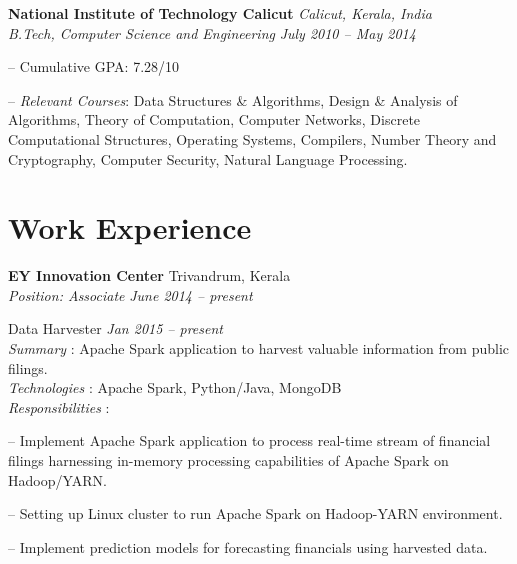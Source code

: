 \documentclass[margin,line]{resume}
\begin{document}
\begin{resume}
    \textbf{National Institute of Technology Calicut} \hfill \textit{Calicut, Kerala, India} \vspace{1mm}\\\vspace{1mm}%
    \textsl{B.Tech, Computer Science and Engineering} \hfill \textit{ July 2010 -- May 2014}\vspace{-3mm}\\\vspace{-1mm}%
    \begin{list2}
        \item[--] Cumulative GPA: 7.28/10 
        \item[--] \textit{Relevant Courses}: Data Structures \& Algorithms, Design \& Analysis of Algorithms, Theory
of Computation, Computer Networks, Discrete Computational Structures, Operating Systems, 
Compilers, Number Theory and Cryptography, Computer Security, Natural Language Processing.
    \end{list2}\vspace{-1.5mm}
    
 \vspace{3mm}


    \section{\mysidestyle Work Experience}


    \textbf{EY Innovation Center } 				\hfill  Trivandrum, Kerala \\
      \textit{Position: Associate } 			\hfill \textit{June 2014 -- present}
  

Data Harvester				 				\hfill \textit{Jan 2015 -- present} \\
\textit{Summary} : Apache Spark application to harvest valuable information from public filings. \\
      \textit{Technologies} : Apache Spark, Python/Java, MongoDB\\
\textit{Responsibilities} : 
     	 	\begin{list2}
\item[--]Implement Apache Spark application to process real-time stream of financial filings harnessing 
 in-memory processing capabilities of Apache Spark on Hadoop/YARN.
	\item[--] Setting up Linux cluster to run Apache Spark on Hadoop-YARN environment.%
	\item[--] Implement prediction models for forecasting financials using harvested data.
	\end{list2}


\end{resume}
\end{document}

